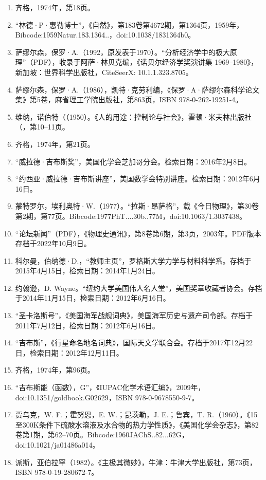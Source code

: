 \begin{enumerate}
\item 齐格，1974年，第18页。
\item “林德·P·惠勒博士”，《自然》，第183卷第4672期，第1364页，1959年，Bibcode:1959Natur.183.1364..，doi:10.1038/1831364b0。
\item 萨缪尔森，保罗·A.（1992，原发表于1970）。“分析经济学中的极大原理”（PDF），收录于阿萨·林贝克编，《诺贝尔经济学奖演讲集 1969–1980》，新加坡：世界科学出版社，CiteSeerX: 10.1.1.323.8705。
\item 萨缪尔森，保罗·A.（1986），凯特·克劳利编，《保罗·A·萨缪尔森科学论文集》第5卷，麻省理工学院出版社，第863页，ISBN 978-0-262-19251-4。
\item 维纳，诺伯特（（1950）。《人的用途：控制论与社会》，霍顿·米夫林出版社（，第10–11页。
\item 齐格，1974年，第21页。
\item “威拉德·吉布斯奖”，美国化学会芝加哥分会。检索日期：2016年2月8日。
\item “约西亚·威拉德·吉布斯讲座”，美国数学会特别讲座。检索日期：2012年6月16日。
\item 蒙特罗尔，埃利奥特·W.（1977）。“拉斯·昂萨格”，载《今日物理》，第30卷第2期，第77页。Bibcode:1977PhT....30b..77M，doi:10.1063/1.3037438。
\item “论坛新闻”（PDF），《物理史通讯》，第8卷第6期，第3页，2003年。PDF版本存档于2022年10月9日。
\item 科尔曼，伯纳德·D.，“教师主页”，罗格斯大学力学与材料科学系。存档于2015年4月15日，检索日期：2014年1月24日。
\item 约翰逊，D. Wayne。“纽约大学美国伟人名人堂”，美国奖章收藏者协会。存档于2014年11月15日，检索日期：2012年6月16日。
\item “圣卡洛斯号”，《美国海军战舰词典》，美国海军历史与遗产司令部。存档于2011年7月12日，检索日期：2012年6月16日。
\item “吉布斯”，《行星命名地名词典》，国际天文学联合会。存档于2017年12月22日，检索日期：2012年12月11日。
\item 齐格，1974年，第96页。
\item “吉布斯能（函数），G”，《IUPAC化学术语汇编》，2009年，doi:10.1351/goldbook.G02629，ISBN 978-0-9678550-9-7。
\item 贾乌克，W. F.；霍努恩，E. W.；昆茨勒，J. E.；鲁宾，T. R.（1960）。《15至300K条件下硫酸水溶液及水合物的热力学性质》，《美国化学会杂志》，第82卷第1期，第62–70页。Bibcode:1960JAChS..82...62G，doi:10.1021/ja01486a014。
\item 派斯，亚伯拉罕（1982）。《主极其微妙》，牛津：牛津大学出版社，第73页，ISBN 978-0-19-280672-7。

\end{enumerate}
